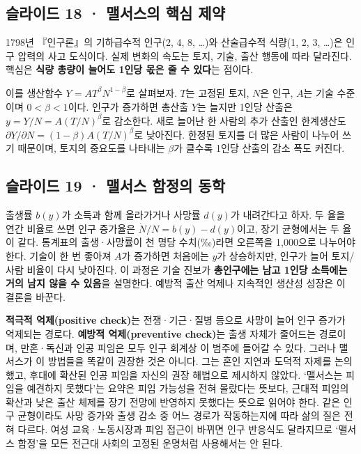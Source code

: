 \documentclass[10pt,a4paper]{article}
\begin{document}
\subsection{슬라이드 18 · 맬서스의 핵심 제약}
1798년 『인구론』의 기하급수적 인구(2, 4, 8, …)와 산술급수적 식량(1, 2, 3, …)은 인구 압력의 사고 도식이다. 실제 변화의 속도는 토지, 기술, 출산 행동에 따라 달라진다. 핵심은 \textbf{식량 총량이 늘어도 1인당 몫은 줄 수 있다}는 점이다.\par

이를 생산함수 $Y=A T^{\beta}N^{1-\beta}$로 살펴보자. $T$는 고정된 토지, $N$은 인구, $A$는 기술 수준이며 $0<\beta<1$이다. 인구가 증가하면 총산출 $Y$는 늘지만 1인당 산출은 $y=Y/N=A(T/N)^{\beta}$로 감소한다. 새로 늘어난 한 사람의 추가 산출인 한계생산도 $\partial Y/\partial N=(1-\beta)A(T/N)^{\beta}$로 낮아진다. 한정된 토지를 더 많은 사람이 나누어 쓰기 때문이며, 토지의 중요도를 나타내는 $\beta$가 클수록 1인당 산출의 감소 폭도 커진다.\par

\subsection{슬라이드 19 · 맬서스 함정의 동학}
출생률 $b(y)$가 소득과 함께 올라가거나 사망률 $d(y)$가 내려간다고 하자. 두 율을 연간 비율로 쓰면 인구 증가율은 $\dot N/N=b(y)-d(y)$이고, 장기 균형에서는 두 율이 같다. 통계표의 출생·사망률이 천 명당 수치(‰)라면 오른쪽을 1,000으로 나누어야 한다. 기술이 한 번 좋아져 $A$가 증가하면 처음에는 $y$가 상승하지만, 인구가 늘어 토지/사람 비율이 다시 낮아진다. 이 과정은 기술 진보가 \textbf{총인구에는 남고 1인당 소득에는 거의 남지 않을 수 있음}을 설명한다. 예방적 출산 억제나 지속적인 생산성 성장은 이 결론을 바꾼다.\par

\textbf{적극적 억제(positive check)}는 전쟁·기근·질병 등으로 사망이 늘어 인구 증가가 억제되는 경로다. \textbf{예방적 억제(preventive check)}는 출생 자체가 줄어드는 경로이며, 만혼·독신과 인공 피임은 모두 인구 회계상 이 범주에 들어갈 수 있다. 그러나 맬서스가 이 방법들을 똑같이 권장한 것은 아니다. 그는 혼인 지연과 도덕적 자제를 논의했고, 후대에 확산된 인공 피임을 자신의 권장 해법으로 제시하지 않았다. ‘맬서스는 피임을 예견하지 못했다’는 요약은 피임 가능성을 전혀 몰랐다는 뜻보다, 근대적 피임의 확산과 낮은 출산 체제를 장기 전망에 반영하지 못했다는 뜻으로 읽어야 한다. 같은 인구 균형이라도 사망 증가와 출생 감소 중 어느 경로가 작동하는지에 따라 삶의 질은 전혀 다르다. 여성 교육·노동시장과 피임 접근이 바뀌면 인구 반응식도 달라지므로 ‘맬서스 함정’을 모든 전근대 사회의 고정된 운명처럼 사용해서는 안 된다.\par
\end{document}
